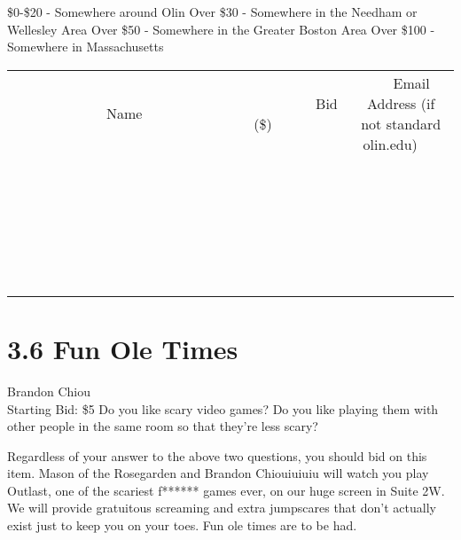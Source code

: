\documentclass[11pt]{article}
\begin{document}
\$0-\$20 - Somewhere around Olin
Over \$30 - Somewhere in the Needham or Wellesley Area
Over \$50 - Somewhere in the Greater Boston Area
Over \$100 - Somewhere in Massachusetts
\\[6ex]
\begin{tabular}{c c c}
~~~~~~~~~~~~~Name~~~~~~~~~~~~~ & ~~~~~~~~~Bid (\$)~~~~~~~~~  & ~~~Email Address (if not standard olin.edu)~~~\\
 & & \\
\hline
 & & \\
\hline
 & & \\
\hline
 & & \\
\hline
 & & \\
\hline
 & & \\
\hline
 & & \\
\hline
 & & \\
\hline
 & & \\
\hline
 & & \\
\hline
 & & \\
\hline
 & & \\
\hline
 & & \\
\hline
 & & \\
\hline
 & & \\
\hline
 & & \\
\hline
 & & \\
\hline
 & & \\
\hline
 & & \\
\hline
 & & \\
\hline
 & & \\
\hline
 & & \\
\hline
 & & \\
\hline
 & & \\
\hline
 & & \\
\hline
 & & \\
\hline
\end{tabular}
\newpage
\section*{3.6 Fun Ole Times}
Brandon Chiou
\\
Starting Bid: \$5
\newline
Do you like scary video games? Do you like playing them with other people in the same room so that they're less scary?

Regardless of your answer to the above two questions, you should bid on this item. Mason of the Rosegarden and Brandon Chiouiuiuiu will watch you play Outlast, one of the scariest f****** games ever, on our huge screen in Suite 2W. We will provide gratuitous screaming and extra jumpscares that don't actually exist just to keep you on your toes. Fun ole times are to be had.
\end{document}
